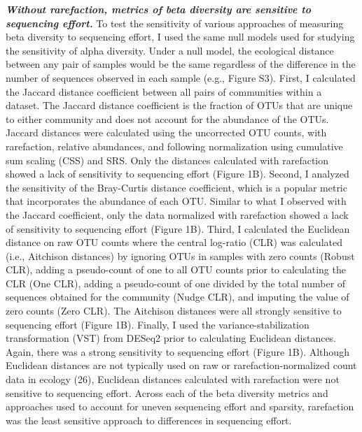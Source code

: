 \documentclass[
]{article}
\begin{document}
\textbf{\emph{Without rarefaction, metrics of beta diversity are
sensitive to sequencing effort.}} To test the sensitivity of various
approaches of measuring beta diversity to sequencing effort, I used the
same null models used for studying the sensitivity of alpha diversity.
Under a null model, the ecological distance between any pair of samples
would be the same regardless of the difference in the number of
sequences observed in each sample (e.g., Figure S3). First, I calculated
the Jaccard distance coefficient between all pairs of communities within
a dataset. The Jaccard distance coefficient is the fraction of OTUs that
are unique to either community and does not account for the abundance of
the OTUs. Jaccard distances were calculated using the uncorrected OTU
counts, with rarefaction, relative abundances, and following
normalization using cumulative sum scaling (CSS) and SRS. Only the
distances calculated with rarefaction showed a lack of sensitivity to
sequencing effort (Figure 1B). Second, I analyzed the sensitivity of the
Bray-Curtis distance coefficient, which is a popular metric that
incorporates the abundance of each OTU. Similar to what I observed with
the Jaccard coefficient, only the data normalized with rarefaction
showed a lack of sensitivity to sequencing effort (Figure 1B). Third, I
calculated the Euclidean distance on raw OTU counts where the central
log-ratio (CLR) was calculated (i.e., Aitchison distances) by ignoring
OTUs in samples with zero counts (Robust CLR), adding a pseudo-count of
one to all OTU counts prior to calculating the CLR (One CLR), adding a
pseudo-count of one divided by the total number of sequences obtained
for the community (Nudge CLR), and imputing the value of zero counts
(Zero CLR). The Aitchison distances were all strongly sensitive to
sequencing effort (Figure 1B). Finally, I used the
variance-stabilization transformation (VST) from DESeq2 prior to
calculating Euclidean distances. Again, there was a strong sensitivity
to sequencing effort (Figure 1B). Although Euclidean distances are not
typically used on raw or rarefaction-normalized count data in ecology
(26), Euclidean distances calculated with rarefaction were not sensitive
to sequencing effort. Across each of the beta diversity metrics and
approaches used to account for uneven sequencing effort and sparsity,
rarefaction was the least sensitive approach to differences in
sequencing effort.
\end{document}
